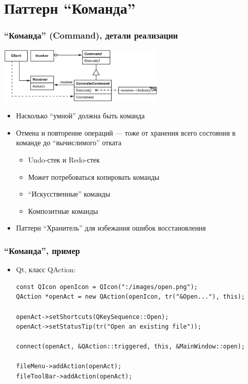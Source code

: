 \documentclass[xetex,mathserif,serif]{beamer}
\begin{document}
	\section{Паттерн ``Команда''}

	\begin{frame}
		\frametitle{``Команда'' (Command), детали реализации}
		\begin{center}
			\includegraphics[width=0.6\textwidth]{command.png}
		\end{center}
		\begin{itemize}
			\item Насколько ``умной'' должна быть команда
			\item Отмена и повторение операций --- тоже от хранения всего состояния в команде до ``вычислимого'' отката
			\begin{itemize}
				\item Undo-стек и Redo-стек
				\item Может потребоваться копировать команды
				\item ``Искусственные'' команды
				\item Композитные команды
			\end{itemize}
			\item Паттерн ``Хранитель'' для избежания ошибок восстановления
		\end{itemize}
	\end{frame}

	\begin{frame}[fragile]
		\frametitle{``Команда'', пример}
		\begin{itemize}
			\item Qt, класс QAction:
			\begin{verbatim}
const QIcon openIcon = QIcon(":/images/open.png");
QAction *openAct = new QAction(openIcon, tr("&Open..."), this);

openAct->setShortcuts(QKeySequence::Open);
openAct->setStatusTip(tr("Open an existing file"));

connect(openAct, &QAction::triggered, this, &MainWindow::open);

fileMenu->addAction(openAct);
fileToolBar->addAction(openAct);
			\end{verbatim}
		\end{itemize}
	\end{frame}
\end{document}
